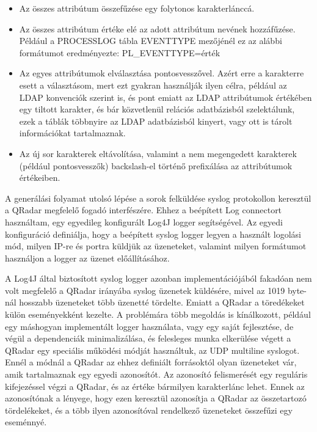 \begin{itemize}
	\item Az összes attribútum összefűzése egy folytonos karakterlánccá.
	
	\item Az összes attribútum értéke elé az adott attribútum nevének hozzáfűzése. Például a PROCESSLOG tábla EVENTTYPE mezőjénél ez az alábbi formátumot eredményezte: PL\_EVENTTYPE={érték}
	
	\item Az egyes attribútumok elválasztása pontosvesszővel. Azért erre a karakterre esett a választásom, mert ezt gyakran használják ilyen célra, például az LDAP konvenciók szerint is, és pont emiatt az LDAP attribútumok értékében egy tiltott karakter, és bár közvetlenül relációs adatbázisból szelektálunk, ezek a táblák többnyire az LDAP adatbázisból kinyert, vagy ott is tárolt információkat tartalmaznak.
	
	\item Az új sor karakterek eltávolítása, valamint a nem megengedett karakterek (például pontosvesszők) backslash-el történő prefixálása az attribútumok értékeiben.
\end{itemize} 




A generálási folyamat utolsó lépése a sorok felküldése syslog protokollon keresztül a QRadar megfelelő fogadó interfészére. Ehhez a beépített Log connectort használtam, egy egyedileg konfigurált Log4J logger segítségével. Az egyedi konfiguráció definiálja, hogy a beépített syslog logger legyen a használt logolási mód, milyen IP-re és portra küldjük az üzeneteket, valamint milyen formátumot használjon a logger az üzenet előállításához.

A Log4J által biztosított syslog logger azonban implementációjából fakadóan nem volt megfelelő a QRadar irányába syslog üzenetek küldésére, mivel az 1019 byte-nál hosszabb üzeneteket több üzenetté tördelte. Emiatt a QRadar a töredékeket külön eseményekként kezelte. A problémára több megoldás is kínálkozott, például egy máshogyan implementált logger használata, vagy egy saját fejlesztése, de végül a dependenciák minimalizálása, és felesleges munka elkerülése végett a QRadar egy speciális működési módját használtuk, az UDP multiline syslogot.\cite{multilnesyslog} Ennél a módnál a QRadar az ehhez definiált forrásoktól olyan üzeneteket vár, amik tartalmaznak egy egyedi azonosítót. Az azonosító felismerését egy reguláris kifejezéssel végzi a QRadar, és az értéke bármilyen karakterlánc lehet. Ennek az azonosítónak a lényege, hogy ezen keresztül azonosítja a QRadar az összetartozó tördelékeket, és a több ilyen azonosítóval rendelkező üzeneteket összefűzi egy eseménnyé.

